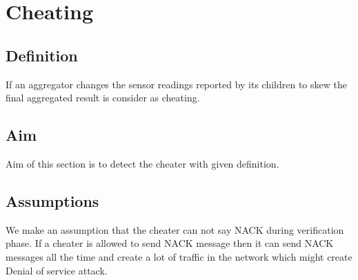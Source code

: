 \chapter{Cheating}

\section{Definition}
If an aggregator changes the sensor readings reported by its children to skew the final aggregated result is consider as cheating.

\section{Aim}
Aim of this section is to detect the cheater with given definition. 

\section{Assumptions}
We make an assumption that the cheater can not say NACK during verification phase. If a cheater is allowed to send NACK message then it can send NACK messages all the time and create a lot of traffic in the network which might create Denial of service attack. 
